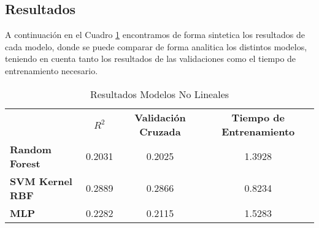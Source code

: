 \subsection{Resultados}

A continuación en el Cuadro \ref{Modelos-No-Lineales-Resultados} encontramos de forma sintetica los resultados de cada modelo, donde se puede comparar de forma analitica los distintos modelos, teniendo en cuenta tanto los resultados de las validaciones como el tiempo de entrenamiento necesario. 

\begin{table}[h]
    \centering
    \begin{tabular}{lccc}
                                        & \textbf{$R^2$} & \textbf{Validación Cruzada}  & \textbf{Tiempo de Entrenamiento} \\
        \textbf{Random Forest}          &  0.2031   &        0.2025     & 1.3928 \\
        \textbf{SVM Kernel RBF}         &  0.2889   &        0.2866     & 0.8234 \\
        \textbf{MLP}                    &  0.2282	&        0.2115     & 1.5283
    \end{tabular}
    \caption{Resultados Modelos No Lineales}
    \label{Modelos-No-Lineales-Resultados}
\end{table}